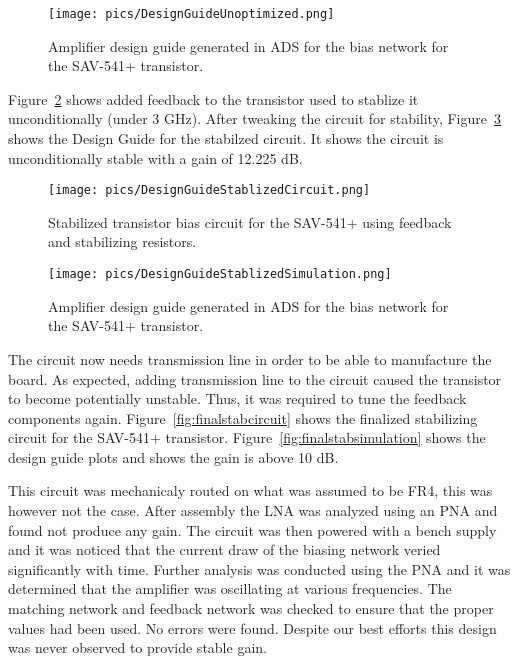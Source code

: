 \documentclass[conference]{IEEEtran}
\begin{document}
\begin{figure}[!h]
\centering
\texttt{[image: pics/DesignGuideUnoptimized.png]}
\caption{Amplifier design guide generated in ADS for the bias network for the SAV-541+ transistor.}
\label{fig:designguide}
\end{figure}

Figure~\ref{fig:designcuidecircuitstabilized} shows added feedback to the transistor used to stablize it unconditionally (under 3 GHz).  After tweaking the circuit for stability, Figure~\ref{fig:designcuidesimulationstabilized} shows the Design Guide for the stabilzed circuit. It shows the circuit is unconditionally stable with a gain of 12.225 dB.

\begin{figure}[!h]
\centering
\texttt{[image: pics/DesignGuideStablizedCircuit.png]}
\caption{Stabilized transistor bias circuit for the SAV-541+ using feedback and stabilizing resistors.}
\label{fig:designcuidecircuitstabilized}
\end{figure}

\begin{figure}[!h]
\centering
\texttt{[image: pics/DesignGuideStablizedSimulation.png]}
\caption{Amplifier design guide generated in ADS for the bias network for the SAV-541+ transistor.}
\label{fig:designcuidesimulationstabilized}
\end{figure}

The circuit now needs transmission line in order to be able to manufacture the board.  As expected, adding transmission line to the circuit caused the transistor to become potentially unstable.  Thus, it was required to tune the feedback components again.  Figure~\ref{fig:finalstabcircuit} shows the finalized stabilizing circuit for the SAV-541+ transistor.  Figure~\ref{fig:finalstabsimulation} shows the design guide plots and shows the gain is above 10 dB.

This circuit was mechanicaly routed on what was assumed to be FR4, this was however not the case. After assembly the LNA was analyzed using an PNA and found not produce any gain. The circuit was then powered with a bench supply and it was noticed that the current draw of the biasing network veried significantly with time. Further analysis was conducted using the PNA and it was determined that the amplifier was oscillating at various frequencies. The matching network and feedback network was checked to ensure that the proper values had been used. No errors were found. Despite our best efforts this design was never observed to provide stable gain.
\end{document}
